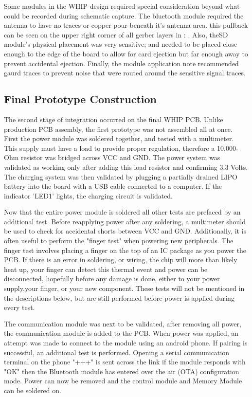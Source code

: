 Some modules in the WHIP design required special consideration beyond what could be recorded during schematic capture. The bluetooth module required the antenna to have no traces or copper pour beneath it's antenna area. this pullback can be seen on the upper right corner of all gerber layers in  : . Also, theSD module's physical placement was very sensitive; and needed to be placed close enough to the edge of the board to allow for card ejection but far enough away to prevent accidental ejection. Finally, the  module application note recommended gaurd traces to prevent noise that were routed around the sensitive signal traces. 


\subsection {Final Prototype Construction}
The second stage of integration occurred on the final WHIP PCB. Unlike production PCB assembly, the first prototype was not assembled all at once. First the power module was soldered together, and tested with a multimeter. This supply must have a load to provide proper regulation, therefore a 10,000-Ohm resistor was bridged across VCC and GND. The power system was validated as working only after adding this load resistor and confirming 3.3 Volts. The charging system was then validated by plugging a partially drained LIPO battery into the board with a USB cable connected to a computer. If the indicator 'LED1' lights, the charging circuit is validated. 

Now that the entire power module is soldered all other tests are prefaced by an additional test. Before reapplying power after any soldering, a multimeter should be used to check for accidental shorts between VCC and GND. Additionally, it is often useful to perform the "finger test" when powering new peripherals. The finger test involves placing a finger on the top of an IC package as you power the PCB. If there is an error in soldering, or wiring, the chip will more than likely heat up, your finger can detect this thermal event and power can be disconnected, hopefully before any damage is done, either to your power supply,your finger, or your new component. These tests will not be mentioned in the descriptions below, but are still performed before power is applied during every test.

The communication module was next to be validated, after removing all power, the communication module is added to the PCB. When power was applied, an attempt was made to connect to the module using an android phone. If pairing is successful, an additional test is performed. Opening a serial communication terminal on the phone "+++" is sent across the link if the module responds with "OK" then the Bluetooth module has entered over the air (OTA) configuration mode. Power can now be removed and the control module and Memory Module can be soldered on. 

